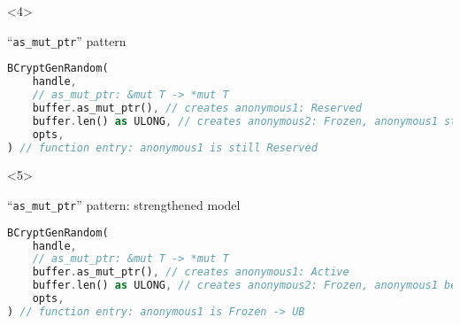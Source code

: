 \begin{frame}[fragile, t]
    \begin{onlyenv}<4>
        \begin{block}{{\cmark} ``\texttt{as\_mut\_ptr}'' pattern}
            \begin{lstlisting}[language=rust, basicstyle=\ttfamily\scriptsize]
BCryptGenRandom(
    handle,
    // as_mut_ptr: &mut T -> *mut T
    buffer.as_mut_ptr(), // creates anonymous1: Reserved
    buffer.len() as ULONG, // creates anonymous2: Frozen, anonymous1 stays Reserved (foreign read)
    opts,
) // function entry: anonymous1 is still Reserved
            \end{lstlisting}
        \end{block}
    \end{onlyenv}

    \begin{onlyenv}<5>
        \begin{block}{{\xmark} ``\texttt{as\_mut\_ptr}'' pattern: strengthened model}
            \begin{lstlisting}[language=rust, basicstyle=\ttfamily\scriptsize]
BCryptGenRandom(
    handle,
    // as_mut_ptr: &mut T -> *mut T
    buffer.as_mut_ptr(), // creates anonymous1: Active
    buffer.len() as ULONG, // creates anonymous2: Frozen, anonymous1 becomes Frozen (foreign read)
    opts,
) // function entry: anonymous1 is Frozen -> UB
            \end{lstlisting}
        \end{block}
    \end{onlyenv}
\end{frame}

